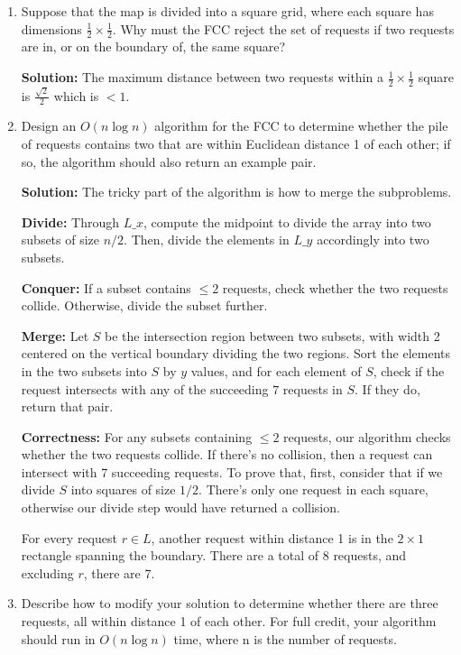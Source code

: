 \documentclass[12pt]{article}
\begin{document}
\begin{enumerate}[label=\textbf{\arabic*}]
	\item Suppose that the map is divided into a square grid, where each square has dimensions $\frac{1}{2} \times \frac{1}{2}$. Why must the FCC reject the set of requests if two requests are in, or on the boundary of, the same square? \\
	\par{\textbf{Solution:} The maximum distance between two requests within a $\frac{1}{2} \times \frac{1}{2}$ square is $\frac{\sqrt{2}}{2}$ which is $< 1$.}
	\item Design an $O(n\log{n})$ algorithm for the FCC to determine whether the pile of requests contains two that are within Euclidean distance 1 of each other; if so, the algorithm should also return an example pair. \\
	\par{\textbf{Solution:} The tricky part of the algorithm is how to merge the subproblems.}
	\par{\textbf{Divide:} Through $L\_x$, compute the midpoint to divide the array into two subsets of size $n/2$. Then, divide the elements in $L\_y$ accordingly into two subsets.}
	\par{\textbf{Conquer:} If a subset contains $\leq 2$ requests, check whether the two requests collide. Otherwise, divide the subset further.}
	\par{\textbf{Merge:} Let $S$ be the intersection region between two subsets, with width 2 centered on the vertical boundary dividing the two regions. Sort the elements in the two subsets into $S$ by $y$ values, and for each element of $S$, check if the request intersects with any of the succeeding $7$ requests in $S$. If they do, return that pair.}
	\par{\textbf{Correctness:} For any subsets containing $\leq 2$ requests, our algorithm checks whether the two requests collide. If there's no collision, then a request can intersect with 7 succeeding requests. To prove that, first, consider that if we divide $S$ into squares of size $1/2$. There's only one request in each square, otherwise our divide step would have returned a collision.}
	\par{For every request $r \in L$, another request within distance 1 is in the $2 \times 1$ rectangle spanning the boundary. There are a total of 8 requests, and excluding $r$, there are 7.}
	\item Describe how to modify your solution to determine whether there are three requests, all within distance 1 of each other. For full credit, your algorithm should run in $O(n\log{n})$ time, where n is the number of requests. 

\end{enumerate}
\end{document}
